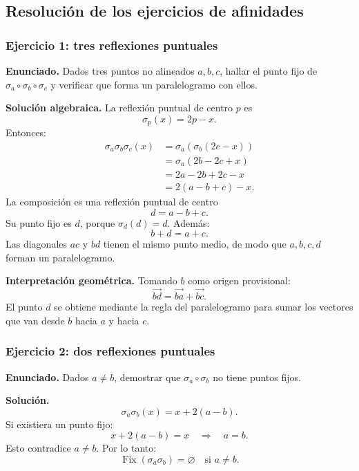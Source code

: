 \subsection{Resolución de los ejercicios de afinidades}\label{cap:17}\label{ap:ejercicios-afinidades}

\subsubsection{Ejercicio 1: tres reflexiones puntuales}

\textbf{Enunciado.} Dados tres puntos no alineados \(a,b,c\), hallar el punto fijo de
\(\sigma_a\circ\sigma_b\circ\sigma_c\) y verificar que forma un paralelogramo con ellos.

\textbf{Solución algebraica.} La reflexión puntual de centro \(p\) es
\[
  \sigma_p(x)=2p-x.
\]
Entonces:
\[
\begin{aligned}
\sigma_a\sigma_b\sigma_c(x)
&=\sigma_a\!\left(\sigma_b(2c-x)\right)\\
&=\sigma_a(2b-2c+x)\\
&=2a-2b+2c-x\\
&=2(a-b+c)-x.
\end{aligned}
\]
La composición es una reflexión puntual de centro
\[
  \boxed{d=a-b+c}.
\]
Su punto fijo es \(d\), porque \(\sigma_d(d)=d\). Además:
\[
  b+d=a+c.
\]
Las diagonales \(ac\) y \(bd\) tienen el mismo punto medio, de modo que \(a,b,c,d\) forman
un paralelogramo.

\textbf{Interpretación geométrica.} Tomando \(b\) como origen provisional:
\[
  \overrightarrow{bd}
  =\overrightarrow{ba}+\overrightarrow{bc}.
\]
El punto \(d\) se obtiene mediante la regla del paralelogramo para sumar los vectores que van
desde \(b\) hacia \(a\) y hacia \(c\).

\subsubsection{Ejercicio 2: dos reflexiones puntuales}

\textbf{Enunciado.} Dados \(a\neq b\), demostrar que
\(\sigma_a\circ\sigma_b\) no tiene puntos fijos.

\textbf{Solución.}
\[
\sigma_a\sigma_b(x)=x+2(a-b).
\]
Si existiera un punto fijo:
\[
x+2(a-b)=x
\quad\Longrightarrow\quad
a=b.
\]
Esto contradice \(a\neq b\). Por lo tanto:
\[
  \boxed{\operatorname{Fix}(\sigma_a\sigma_b)=\varnothing
  \quad\text{si }a\neq b.}
\]

